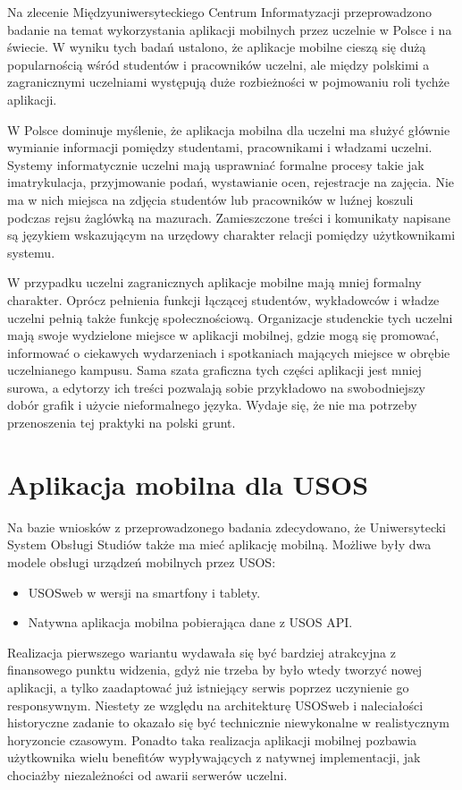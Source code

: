 \documentclass{pracamgr}
\begin{document}
Na zlecenie Międzyuniwersyteckiego Centrum Informatyzacji przeprowadzono
badanie na temat wykorzystania aplikacji mobilnych przez uczelnie w
Polsce i na świecie. W wyniku tych badań ustalono, że aplikacje mobilne
cieszą się dużą popularnością wśród studentów i pracowników uczelni, ale
między polskimi a zagranicznymi uczelniami występują duże rozbieżności w
pojmowaniu roli tychże aplikacji.

W Polsce dominuje myślenie, że aplikacja mobilna dla uczelni ma służyć głównie
wymianie informacji pomiędzy studentami, pracownikami i władzami uczelni.
Systemy informatycznie uczelni mają usprawniać formalne procesy takie jak
imatrykulacja, przyjmowanie podań, wystawianie ocen, rejestracje na zajęcia.
Nie ma w nich miejsca na zdjęcia studentów lub pracowników w luźnej koszuli
podczas rejsu żaglówką na mazurach. Zamieszczone treści i komunikaty napisane
są językiem wskazującym na urzędowy charakter relacji pomiędzy użytkownikami
systemu.

W przypadku uczelni zagranicznych aplikacje mobilne mają mniej formalny
charakter. Oprócz pełnienia funkcji łączącej studentów, wykładowców i władze
uczelni pełnią także funkcję społecznościową. Organizacje studenckie tych
uczelni mają swoje wydzielone miejsce w aplikacji mobilnej, gdzie mogą się
promować, informować o ciekawych wydarzeniach i spotkaniach mających miejsce
w obrębie uczelnianego kampusu. Sama szata graficzna tych części aplikacji
jest mniej surowa, a edytorzy ich treści pozwalają sobie przykładowo na
swobodniejszy dobór grafik i użycie nieformalnego języka. Wydaje się, że nie
ma potrzeby przenoszenia tej praktyki na polski grunt.

\section{Aplikacja mobilna dla USOS}

Na bazie wniosków z przeprowadzonego badania zdecydowano, że Uniwersytecki
System Obsługi Studiów także ma mieć aplikację mobilną. Możliwe były dwa
modele obsługi urządzeń mobilnych przez USOS:

\begin{itemize}
	\item USOSweb w wersji na smartfony i tablety.
	\item Natywna aplikacja mobilna pobierająca dane z USOS API.
\end{itemize}

Realizacja pierwszego wariantu wydawała się być bardziej atrakcyjna z finansowego
punktu widzenia, gdyż nie trzeba by było wtedy tworzyć nowej aplikacji, a tylko
zaadaptować już istniejący serwis poprzez uczynienie go responsywnym. Niestety
ze względu na architekturę USOSweb i naleciałości historyczne zadanie to okazało
się być technicznie niewykonalne w realistycznym horyzoncie czasowym. Ponadto
taka realizacja aplikacji mobilnej pozbawia użytkownika wielu benefitów wypływających
z natywnej implementacji, jak chociażby niezależności od awarii serwerów uczelni.
\end{document}
